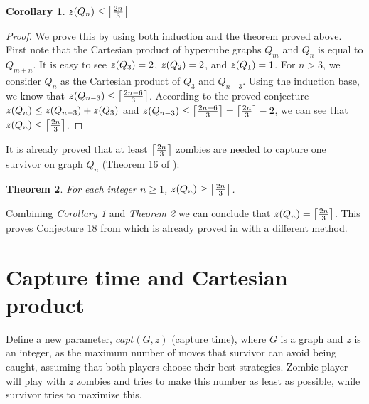 \documentclass[1p]{elsarticle}
\DeclarePairedDelimiter\ceil{\lceil}{\rceil} \DeclarePairedDelimiter\floor{\lfloor}{\rfloor}
\newtheorem{theorem}{Theorem}
\newtheorem{corollary}[theorem]{Corollary}
\newcommand{\zn}{\ooalign{$z$\cr\hfil\rule[.5ex]{.2em}{.08ex}\hfil\cr}}
\begin{document}
\begin{corollary}
	\label{C3}
	$\zn(Q_{n}) \leq \ceil*{\frac{2n}{3}}$
\end{corollary}
\begin{proof}
	We prove this by using both induction and the theorem proved above. First note that the Cartesian product of
	hypercube graphs $Q_{m}$ and $Q_{n}$ is equal to $Q_{m+n}$. It is easy to see $\zn(Q_3) = 2$, $\zn(Q_2) = 2$, and
	$\zn(Q_1) = 1$. For $n > 3$, we consider $Q_n$ as the Cartesian product of $Q_3$ and $Q_{n-3}$. Using the induction
	base, we know that $\zn(Q_{n-3}) \leq \ceil*{\frac{2n - 6}{3}}$. According to the proved conjecture $\zn(Q_n) \leq
	\zn(Q_{n-3}) + \zn(Q_3)$ and $\zn(Q_{n-3}) \leq \ceil*{\frac{2n - 6}{3}} = \ceil*{\frac{2n}{3}} - 2$, we can see that
	$\zn(Q_n) \leq \ceil*{\frac{2n}{3}}$.
\end{proof}

It is already proved that at least $\ceil*{\frac{2n}{3}}$ zombies are needed to capture one survivor on graph $Q_n$
(Theorem 16 of \cite{Fitz16}):

\begin{theorem}
	\label{T4}
	For each integer $n \geq 1$, $\zn(Q_n) \geq \ceil*{\frac{2n}{3}} $.
\end{theorem}

Combining {\it Corollary \ref{C3}} and {\it Theorem \ref{T4}} we can conclude that $\zn(Q_n) = \ceil*{\frac{2n}{3}}$.
This proves Conjecture 18 from \cite{Fitz16} which is already proved in \cite{Offner19} with a different method. 
	

\section{Capture time and Cartesian product}\label{capturetime}
	Define a new parameter, $capt(G,z)$ (capture time), where $G$ is a graph and $z$ is an integer, as the maximum number
	of moves that survivor can avoid being caught, assuming that both players choose their best strategies. Zombie
	player will play with $z$ zombies and tries to make this number as least as possible, while survivor tries to
	maximize this.
\end{document}
